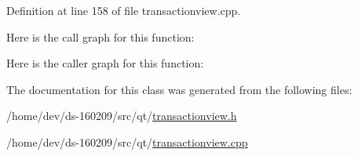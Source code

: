 Definition at line 158 of file transactionview.\+cpp.



Here is the call graph for this function\+:




Here is the caller graph for this function\+:




The documentation for this class was generated from the following files\+:\begin{DoxyCompactItemize}
\item 
/home/dev/ds-\/160209/src/qt/\hyperlink{transactionview_8h}{transactionview.\+h}\item 
/home/dev/ds-\/160209/src/qt/\hyperlink{transactionview_8cpp}{transactionview.\+cpp}\end{DoxyCompactItemize}

